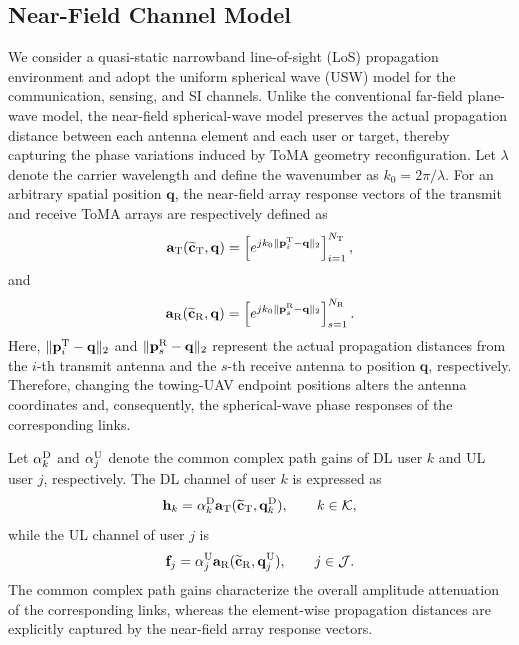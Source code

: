 \documentclass[letterpaper,journal]{IEEEtran}
\begin{document}
\subsection{Near-Field Channel Model}
\label{subsec:channel_model}

We consider a quasi-static narrowband line-of-sight (LoS) propagation environment and adopt the uniform spherical wave (USW) model for the communication, sensing, and SI channels. Unlike the conventional far-field plane-wave model, the near-field spherical-wave model preserves the actual propagation distance between each antenna element and each user or target, thereby capturing the phase variations induced by ToMA geometry reconfiguration. Let $\lambda$ denote the carrier wavelength and define the wavenumber as $k_0=2\pi/\lambda$. For an arbitrary spatial position $\mathbf q$, the near-field array response vectors of the transmit and receive ToMA arrays are respectively defined as
\begin{equation}
\mathbf a_{\rm T}
(\widetilde{\mathbf c}_{\rm T},\mathbf q)
=
\left[
e^{j k_0\|\mathbf p_i^{\rm T}-\mathbf q\|_2}
\right]_{i=1}^{N_{\rm T}},
\label{eq:tx_nf_response}
\end{equation}
and
\begin{equation}
\mathbf a_{\rm R}
(\widetilde{\mathbf c}_{\rm R},\mathbf q)
=
\left[
e^{j k_0\|\mathbf p_s^{\rm R}-\mathbf q\|_2}
\right]_{s=1}^{N_{\rm R}}.
\label{eq:rx_nf_response}
\end{equation}
Here, $\|\mathbf p_i^{\rm T}-\mathbf q\|_2$ and $\|\mathbf p_s^{\rm R}-\mathbf q\|_2$ represent the actual propagation distances from the $i$-th transmit antenna and the $s$-th receive antenna to position $\mathbf q$, respectively. Therefore, changing the towing-UAV endpoint positions alters the antenna coordinates and, consequently, the spherical-wave phase responses of the corresponding links.

Let $\alpha_k^{\rm D}$ and $\alpha_j^{\rm U}$ denote the common complex path gains of DL user $k$ and UL user $j$, respectively. The DL channel of user $k$ is expressed as
\begin{equation}
\mathbf h_k
=
\alpha_k^{\rm D}
\mathbf a_{\rm T}
(\widetilde{\mathbf c}_{\rm T},\mathbf q_k^{\rm D}),
\qquad
k\in\mathcal K,
\label{eq:dl_channel}
\end{equation}
while the UL channel of user $j$ is
\begin{equation}
\mathbf f_j
=
\alpha_j^{\rm U}
\mathbf a_{\rm R}
(\widetilde{\mathbf c}_{\rm R},\mathbf q_j^{\rm U}),
\qquad
j\in\mathcal J.
\label{eq:ul_channel}
\end{equation}
The common complex path gains characterize the overall amplitude attenuation of the corresponding links, whereas the element-wise propagation distances are explicitly captured by the near-field array response vectors.
\end{document}

